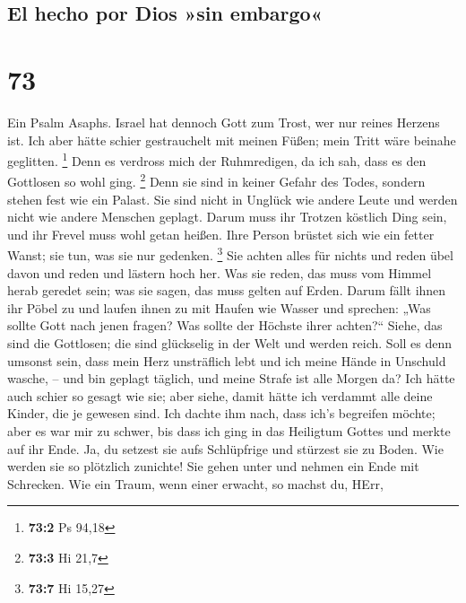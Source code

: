 \hypertarget{el-hecho-por-dios-sin-embargo}{%
\subsection{El hecho por Dios »sin
embargo«}\label{el-hecho-por-dios-sin-embargo}}

\hypertarget{section-72}{%
\section{73}\label{section-72}}

 Ein Psalm Asaphs. Israel hat dennoch Gott zum Trost, wer
nur reines Herzens ist.  Ich aber hätte schier
gestrauchelt mit meinen Füßen; mein Tritt wäre beinahe geglitten.
\footnote{\textbf{73:2} Ps 94,18}  Denn es verdross mich
der Ruhmredigen, da ich sah, dass es den Gottlosen so wohl ging.
\footnote{\textbf{73:3} Hi 21,7}  Denn sie sind in keiner
Gefahr des Todes, sondern stehen fest wie ein Palast.  Sie
sind nicht in Unglück wie andere Leute und werden nicht wie andere
Menschen geplagt.  Darum muss ihr Trotzen köstlich Ding
sein, und ihr Frevel muss wohl getan heißen.  Ihre Person
brüstet sich wie ein fetter Wanst; sie tun, was sie nur gedenken.
\footnote{\textbf{73:7} Hi 15,27}  Sie achten alles für
nichts und reden übel davon und reden und lästern hoch her.
 Was sie reden, das muss vom Himmel herab geredet sein;
was sie sagen, das muss gelten auf Erden.  Darum fällt
ihnen ihr Pöbel zu und laufen ihnen zu mit Haufen wie Wasser
 und sprechen: „Was sollte Gott nach jenen fragen? Was
sollte der Höchste ihrer achten?{}``  Siehe, das sind die
Gottlosen; die sind glückselig in der Welt und werden reich.
 Soll es denn umsonst sein, dass mein Herz unsträflich
lebt und ich meine Hände in Unschuld wasche, --  und bin
geplagt täglich, und meine Strafe ist alle Morgen da? 
Ich hätte auch schier so gesagt wie sie; aber siehe, damit hätte ich
verdammt alle deine Kinder, die je gewesen sind.  Ich
dachte ihm nach, dass ich's begreifen möchte; aber es war mir zu schwer,
 bis dass ich ging in das Heiligtum Gottes und merkte auf
ihr Ende.  Ja, du setzest sie aufs Schlüpfrige und
stürzest sie zu Boden.  Wie werden sie so plötzlich
zunichte! Sie gehen unter und nehmen ein Ende mit Schrecken.
 Wie ein Traum, wenn einer erwacht, so machst du, HErr,

